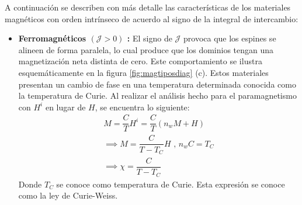 \documentclass[../main.tex]{subfiles}
\begin{document}
A continuación se describen con más detalle las características de los materiales magnéticos con orden intrínseco de acuerdo al signo de la integral de intercambio:

\begin{itemize}
    \item \textbf{Ferromagnéticos $(\mathcal{J}>0)$ :} El signo de $\mathcal{J}$ provoca que los espines se alineen de forma paralela, lo cual produce que los dominios tengan una magnetización neta distinta de cero. Este comportamiento se ilustra \color{red} esquemáticamente en la figura \ref{fig:magtiposdiag} (c). Estos materiales presentan un cambio de fase en una temperatura determinada conocida como la temperatura de Curie. Al realizar el análisis hecho para el paramagnetismo con $H^i$ en lugar de $H$, se encuentra lo siguiente:
    \begin{equation}\begin{split}
        M=\dfrac{C}{T}H^i=\dfrac{C}{T}(n_wM+H)\\
        \implies M=\dfrac{C}{T-T_C}H\text{ , }n_wC=T_C\\
        \implies \chi=\dfrac{C}{T-T_C}
    \end{split}
        \label{eq:leycurieweiss}
    \end{equation}
    Donde $T_C$ se conoce como temperatura de Curie. Esta expresión se conoce como la ley de Curie-Weiss.


\end{itemize}
\end{document}
